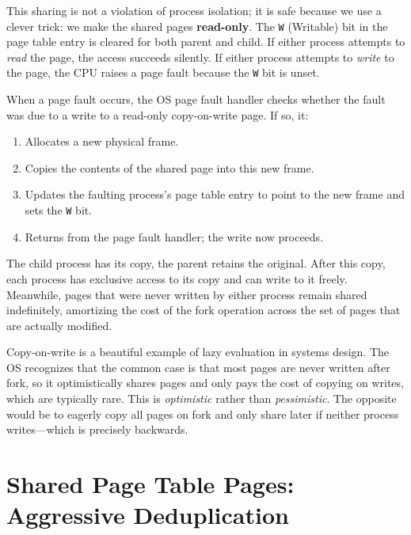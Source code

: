 \documentclass[11pt]{article}
\begin{document}
This sharing is not a violation of process isolation; it is safe because we use a clever trick: we make the shared pages \textbf{read-only}. The \texttt{W} (Writable) bit in the page table entry is cleared for both parent and child. If either process attempts to \emph{read} the page, the access succeeds silently. If either process attempts to \emph{write} to the page, the CPU raises a page fault because the \texttt{W} bit is unset.

When a page fault occurs, the OS page fault handler checks whether the fault was due to a write to a read-only copy-on-write page. If so, it:

\begin{enumerate}
    \item Allocates a new physical frame.
    \item Copies the contents of the shared page into this new frame.
    \item Updates the faulting process's page table entry to point to the new frame and sets the \texttt{W} bit.
    \item Returns from the page fault handler; the write now proceeds.
\end{enumerate}

The child process has its copy, the parent retains the original. After this copy, each process has exclusive access to its copy and can write to it freely. Meanwhile, pages that were never written by either process remain shared indefinitely, amortizing the cost of the fork operation across the set of pages that are actually modified.

\begin{keyintuition}
Copy-on-write is a beautiful example of lazy evaluation in systems design. The OS recognizes that the common case is that most pages are never written after fork, so it optimistically shares pages and only pays the cost of copying on writes, which are typically rare. This is \emph{optimistic} rather than \emph{pessimistic}. The opposite would be to eagerly copy all pages on fork and only share later if neither process writes---which is precisely backwards.
\end{keyintuition}

\section{Shared Page Table Pages: Aggressive Deduplication}
\end{document}
